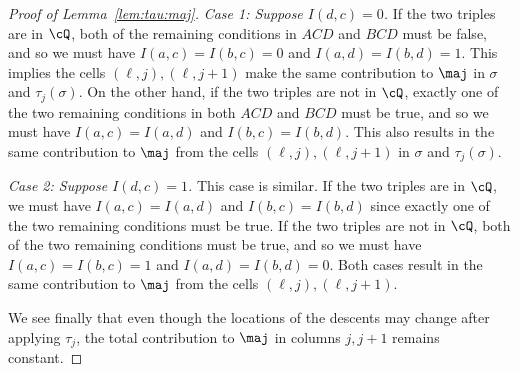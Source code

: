 \begin{proof}[Proof of Lemma~\ref{lem:tau:maj}]
\emph{Case 1: Suppose $I(d,c)=0$.} If the two triples are in $\cQ$, both of the remaining conditions in $ACD$ and $BCD$ must be false, and so we must have $I(a,c)=I(b,c)=0$ and $I(a,d)=I(b,d)=1$. This implies the cells $(\ell,j),(\ell,j+1)$ make the same contribution to $\maj$ in $\sigma$ and $\tau_j(\sigma)$. On the other hand, if the two triples are not in $\cQ$, exactly one of the two remaining conditions in both $ACD$ and $BCD$ must be true, and so we must have $I(a,c)=I(a,d)$ and $I(b,c)=I(b,d)$. This also results in the same contribution to $\maj$ from the cells $(\ell,j),(\ell,j+1)$ in $\sigma$ and $\tau_j(\sigma)$.

\emph{Case 2: Suppose $I(d,c)=1$.} This case is similar. If the two triples are in $\cQ$, we must have $I(a,c)=I(a,d)$ and $I(b,c)=I(b,d)$ since exactly one of the two remaining conditions must be true. If the two triples are not in $\cQ$, both of the two remaining conditions must be true, and so we must have $I(a,c)=I(b,c)=1$ and $I(a,d)=I(b,d)=0$. Both cases result in the same contribution to $\maj$ from the cells $(\ell,j),(\ell,j+1)$.

We see finally that even though the locations of the descents may change after applying $\tau_j$, the total contribution to $\maj$ in columns $j,j+1$ remains constant.
\end{proof}

